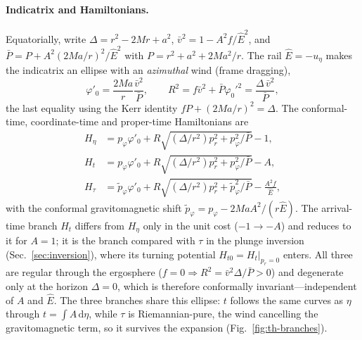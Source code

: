 \documentclass[12pt]{iopart}
\newcommand{\Ehat}{\hat E}
\newcommand{\dd}{\mathrm{d}}
\begin{document}
\paragraph{Indicatrix and Hamiltonians.} Equatorially, write
$\Delta=r^2-2Mr+a^2$, $\bar v^2=1-A^2f/\Ehat^2$, and
$\bar P=P+A^2(2Ma/r)^2/\Ehat^2$ with $P=r^2+a^2+2Ma^2/r$. The rail
$\Ehat=-u_\eta$ makes the indicatrix an ellipse with an \emph{azimuthal} wind
(frame dragging),
\begin{equation}
    \varphi'_0=\frac{2Ma}{r}\frac{\bar v^2}{\bar P},\qquad
    R^2=f\bar v^2+\bar P\varphi_0'^2=\frac{\Delta\,\bar v^2}{\bar P},
    \label{eq:tk-ind}
\end{equation}
the last equality using the Kerr identity $fP+(2Ma/r)^2=\Delta$. The
conformal-time, coordinate-time and proper-time Hamiltonians are
\begin{align}
    H_\eta&=p_\varphi\varphi'_0
        +R\sqrt{(\Delta/r^2)p_r^2+p_\varphi^2/\bar P}-1,
    \label{eq:Heta}\\
    H_t&=p_\varphi\varphi'_0
        +R\sqrt{(\Delta/r^2)p_r^2+p_\varphi^2/\bar P}-A,
    \label{eq:Ht-tk}\\
    H_\tau&=\tilde p_\varphi\varphi'_0
        +R\sqrt{(\Delta/r^2)p_r^2+\tilde p_\varphi^2/\bar P}-\frac{A^2 f}{\Ehat},
    \label{eq:Htau-tk}
\end{align}
with the conformal gravitomagnetic shift
$\tilde p_\varphi=p_\varphi-2MaA^2/(r\Ehat)$. The arrival-time branch $H_t$ differs
from $H_\eta$ only in the unit cost ($-1\to-A$) and reduces to it for $A=1$; it is
the branch compared with $\tau$ in the plunge inversion
(Sec.~\ref{sec:inversion}), where its turning potential
$H_{t0}=H_t|_{p_r=0}$ enters. All three are regular through the
ergosphere ($f=0\Rightarrow R^2=\bar v^2\Delta/\bar P>0$) and degenerate only at
the horizon $\Delta=0$, which is therefore conformally invariant---independent of
$A$ and $\Ehat$. The three branches share this ellipse: $t$ follows the same
curves as $\eta$ through $t=\int A\,\dd\eta$, while $\tau$ is Riemannian-pure, the
wind cancelling the gravitomagnetic term, so it survives the expansion
(Fig.~\ref{fig:th-branches}).
\end{document}
